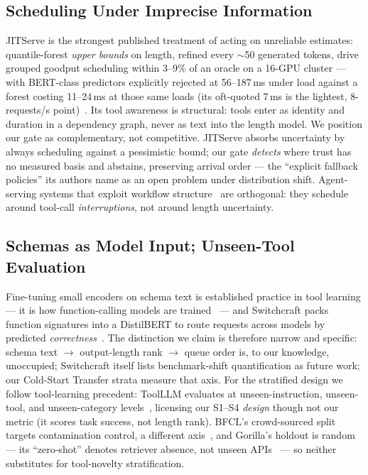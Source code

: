 \subsection{Scheduling Under Imprecise Information}
JITServe is the strongest published treatment of acting on unreliable
estimates: quantile-forest \emph{upper bounds} on length, refined every
$\sim$50 generated tokens, drive grouped goodput scheduling within 3--9\% of
an oracle on a 16-GPU cluster --- with BERT-class predictors explicitly
rejected at 56--187\,ms under load against a forest costing 11--24\,ms at
those same loads (its oft-quoted 7\,ms is the lightest, 8-requests/s
point)~\cite{jitServe2026}. Its tool awareness is structural: tools enter as
identity and duration in a dependency graph, never as text into the length
model. We position our gate as complementary, not competitive. JITServe
absorbs uncertainty by always scheduling against a pessimistic bound; our
gate \emph{detects} where trust has no measured basis and abstains,
preserving arrival order --- the ``explicit fallback policies'' its authors
name as an open problem under distribution shift. Agent-serving systems that
exploit workflow structure~\cite{agentix2026,infercept2024} are orthogonal:
they schedule around tool-call \emph{interruptions}, not around length
uncertainty.

\subsection{Schemas as Model Input; Unseen-Tool Evaluation}
Fine-tuning small encoders on schema text is established practice in tool
learning --- it is how function-calling models are
trained~\cite{toolace2024,qin2024toolllm,patil2024gorilla} --- and
Switchcraft packs function signatures into a DistilBERT to route requests
across models by predicted \emph{correctness}~\cite{switchcraft2026}. The
distinction we claim is therefore narrow and specific: schema text
$\rightarrow$ output-length rank $\rightarrow$ queue order is, to our
knowledge, unoccupied; Switchcraft itself lists benchmark-shift
quantification as future work; our Cold-Start Transfer strata measure that
axis. For the stratified design we follow tool-learning precedent:
ToolLLM evaluates at unseen-instruction, unseen-tool, and unseen-category
levels~\cite{qin2024toolllm}, licensing our S1--S4 \emph{design} though not
our metric (it scores task success, not length rank). BFCL's crowd-sourced
split targets contamination control, a different axis~\cite{patil2025bfcl},
and Gorilla's holdout is random --- its ``zero-shot'' denotes retriever
absence, not unseen APIs~\cite{patil2024gorilla} --- so neither substitutes
for tool-novelty stratification.

